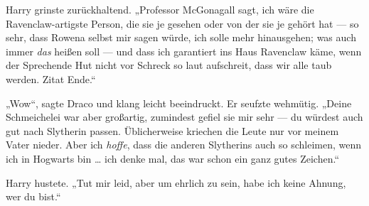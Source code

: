 Harry grinste zurückhaltend.
„Professor McGonagall sagt, ich wäre die Ravenclaw-artigste Person, die sie je gesehen oder von der sie je gehört hat — so sehr, dass Rowena selbst mir sagen würde, ich solle mehr hinausgehen; was auch immer \emph{das} heißen soll — und dass ich garantiert ins Haus Ravenclaw käme, wenn der Sprechende Hut nicht vor Schreck so laut aufschreit, dass wir alle taub werden. Zitat Ende.“

„Wow“, sagte Draco und klang leicht beeindruckt. Er seufzte wehmütig.
„Deine Schmeichelei war aber großartig, zumindest gefiel sie mir sehr — du würdest auch gut nach Slytherin passen. Üblicherweise kriechen die Leute nur vor meinem Vater nieder. Aber ich \emph{hoffe}, dass die anderen Slytherins auch so schleimen, wenn ich in Hogwarts bin … ich denke mal, das war schon ein ganz gutes Zeichen.“

Harry hustete.
„Tut mir leid, aber um ehrlich zu sein, habe ich keine Ahnung, wer du bist.“

